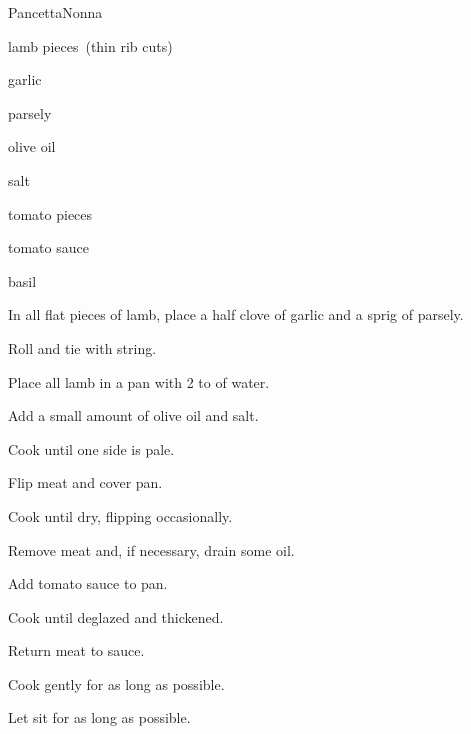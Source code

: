 \begin{recipe}{Pancetta}{Nonna}{}

\begin{ingredients}
\item lamb pieces~(thin rib cuts)
\item garlic
\item parsely
\item olive oil
\item salt
\item tomato pieces
\item tomato sauce
\item basil
\end{ingredients}

\begin{directions}
\item In all flat pieces of lamb, place a half clove of garlic and a sprig of parsely.
\item Roll and tie with string.
\item Place all lamb in a pan with 2 to  of water.
\item Add a small amount of olive oil and salt.
\item Cook until one side is pale.
\item Flip meat and cover pan.
\item Cook until dry, flipping occasionally.
\item Remove meat and, if necessary, drain some oil.
\item Add tomato sauce to pan.
\item Cook until deglazed and thickened.
\item Return meat to sauce.
\item Cook gently for as long as possible.
\item Let sit for as long as possible.
\end{directions}

\end{recipe}
